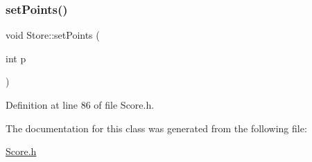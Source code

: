 \subsubsection{\texorpdfstring{set\+Points()}{setPoints()}}
{\footnotesize\ttfamily void Store\+::set\+Points (\begin{DoxyParamCaption}\item[{int}]{p }\end{DoxyParamCaption})\hspace{0.3cm}{\ttfamily [inline]}}



Definition at line 86 of file Score.\+h.



The documentation for this class was generated from the following file\+:\begin{DoxyCompactItemize}
\item 
\hyperlink{_score_8h}{Score.\+h}\end{DoxyCompactItemize}
